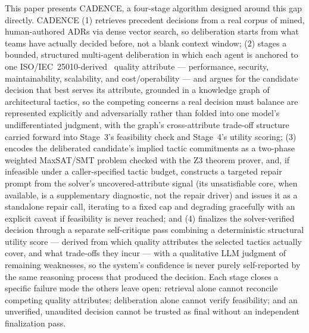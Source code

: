 \documentclass[preprint,12pt,authoryear]{elsarticle}
\renewcommand{\_}{\textunderscore\allowbreak{}}
\begin{document}
This paper presents CADENCE, a four-stage algorithm designed around this gap directly. CADENCE (1) retrieves precedent decisions from a real corpus of mined, human-authored ADRs via dense vector search, so deliberation starts from what teams have actually decided before, not a blank context window; (2) stages a bounded, structured multi-agent deliberation in which each agent is anchored to one ISO/IEC~25010-derived~\citep{iso25010} quality attribute --- performance, security, maintainability, scalability, and cost/operability --- and argues for the candidate decision that best serves its attribute, grounded in a knowledge graph of architectural tactics, so the competing concerns a real decision must balance are represented explicitly and adversarially rather than folded into one model's undifferentiated judgment, with the graph's cross-attribute trade-off structure carried forward into Stage~3's feasibility check and Stage~4's utility scoring; (3) encodes the deliberated candidate's implied tactic commitments as a two-phase weighted MaxSAT/SMT problem checked with the Z3 theorem prover, and, if infeasible under a caller-specified tactic budget, constructs a targeted repair prompt from the solver's uncovered-attribute signal (its unsatisfiable core, when available, is a supplementary diagnostic, not the repair driver) and issues it as a standalone repair call, iterating to a fixed cap and degrading gracefully with an explicit caveat if feasibility is never reached; and (4) finalizes the solver-verified decision through a separate self-critique pass combining a deterministic structural utility score --- derived from which quality attributes the selected tactics actually cover, and what trade-offs they incur --- with a qualitative LLM judgment of remaining weaknesses, so the system's confidence is never purely self-reported by the same reasoning process that produced the decision. Each stage closes a specific failure mode the others leave open: retrieval alone cannot reconcile competing quality attributes; deliberation alone cannot verify feasibility; and an unverified, unaudited decision cannot be trusted as final without an independent finalization pass.
\end{document}
